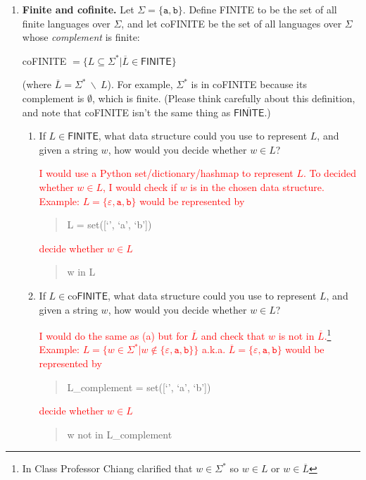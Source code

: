 \documentclass{article}
\newcommand{\e}{\varepsilon}
\newcommand{\s}{\Sigma}
\newcommand{\str}{\texttt}
\newcommand{\newp}{\\[2mm]}
\begin{document}
\begin{enumerate}
    \item \textbf{Finite and cofinite.} Let $\s = \{\str{a}, \str{b}\}$. Define \textsf{FINITE} to be the set of all finite languages over $\s$, and let co\textsf{FINITE} be the set of all languages over $\s$ whose \textit{complement} is finite:
    \begin{center}
        co\textsf{FINITE} $= \{L \subseteq \s^* | \overline{L} \in \textsf{FINITE}\}$
    \end{center}
    (where $\overline{L} = \s^* \:\backslash \: L$). For example, $\s^*$ is in  co\textsf{FINITE} because its complement is $\emptyset$, which is finite. (Please think carefully about this definition, and note that co\textsf{FINITE} isn’t the same thing as $\overline{\textsf{FINITE}}$.)
    \begin{enumerate}
        \item If $L \in \textsf{FINITE}$, what data structure could you use to represent $L$, and given a string $w$, how would you decide whether $w \in L$?\newp
        \textcolor{red}{
            I would use a Python set/dictionary/hashmap to represent $L$. To decided whether $w \in L$, I would check if $w$ is in the chosen data structure.\newp
            Example: $L = \{ \e, \str{a}, \str{b} \}$ would be represented by 
            \begin{quote}
                L = set([`', `a', `b'])
            \end{quote}
            decide whether $w \in L$
            \begin{quote}
                w in L
            \end{quote}
        }
        \item If $L \in \text{co}\textsf{FINITE}$, what data structure could you use to represent $L$, and given a string $w$, how would you decide whether $w \in L$?\newp
        \textcolor{red}{
            I would do the same as (a) but for $\overline{L}$ and check that $w$ is not in $\overline{L}$.\footnote{ In Class Professor Chiang clarified that $w \in \s^*$ so $w \in L$ or $w \in \overline{L}$}\newp
            Example: $L = \big\{w \in \s^* | w \notin \{ \e, \str{a}, \str{b} \}\big\}$ a.k.a. $\overline{L} = \{ \e, \str{a}, \str{b} \}$ would be represented by 
            \begin{quote}
                L\_complement = set([`', `a', `b'])
            \end{quote}
            decide whether $w \in L$
            \begin{quote}
                w not in L\_complement

\end{quote}}
\end{enumerate}
\end{enumerate}
\end{document}
